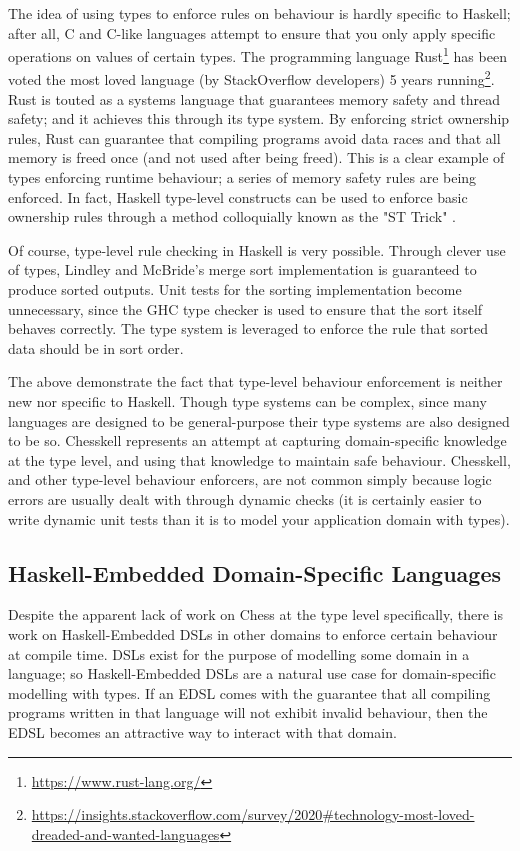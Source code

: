 The idea of using types to enforce rules on behaviour is hardly specific to Haskell; after all, C and C-like languages attempt to ensure that you only apply specific operations on values of certain types. The programming language Rust\footnote{\url{https://www.rust-lang.org/}} has been voted the most loved language (by StackOverflow developers) 5 years running\footnote{\url{https://insights.stackoverflow.com/survey/2020\#technology-most-loved-dreaded-and-wanted-languages}}. Rust is touted as a systems language that guarantees memory safety and thread safety; and it achieves this through its type system. By enforcing strict ownership rules, Rust can guarantee that compiling programs avoid data races and that all memory is freed once (and not used after being freed). This is a clear example of types enforcing runtime behaviour; a series of memory safety rules are being enforced. In fact, Haskell type-level constructs can be used to enforce basic ownership rules through a method colloquially known as the "ST Trick" \cite{twt}.

Of course, type-level rule checking in Haskell is very possible. Through clever use of types, Lindley and McBride's merge sort implementation \cite{hasochism} is guaranteed to produce sorted outputs. Unit tests for the sorting implementation become unnecessary, since the GHC type checker is used to ensure that the sort itself behaves correctly. The type system is leveraged to enforce the rule that sorted data should be in sort order.

The above demonstrate the fact that type-level behaviour enforcement is neither new nor specific to Haskell. Though type systems can be complex, since many languages are designed to be general-purpose their type systems are also designed to be so. Chesskell represents an attempt at capturing domain-specific knowledge at the type level, and using that knowledge to maintain safe behaviour. Chesskell, and other type-level behaviour enforcers, are not common simply because logic errors are usually dealt with through dynamic checks (it is certainly easier to write dynamic unit tests than it is to model your application domain with types).

\subsection{Haskell-Embedded Domain-Specific Languages}

Despite the apparent lack of work on Chess at the type level specifically, there is work on Haskell-Embedded DSLs in other domains to enforce certain behaviour at compile time. DSLs exist for the purpose of modelling some domain in a language; so Haskell-Embedded DSLs are a natural use case for domain-specific modelling with types. If an EDSL comes with the guarantee that all compiling programs written in that language will not exhibit invalid behaviour, then the EDSL becomes an attractive way to interact with that domain.

